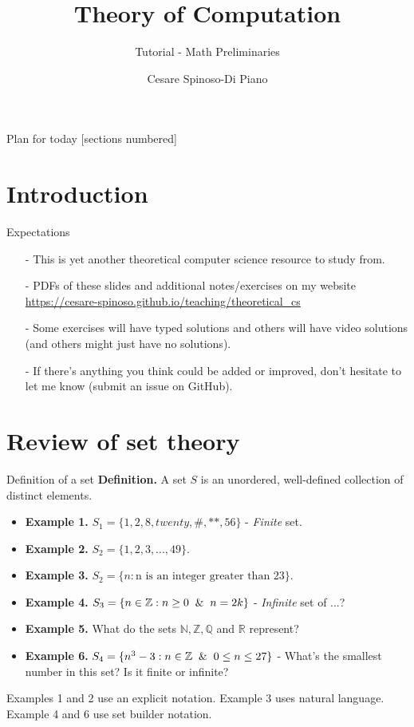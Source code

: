 \documentclass[10pt]{beamer}
\title{Theory of Computation}
\subtitle{Tutorial - Math Preliminaries}
\author{Cesare Spinoso-Di Piano}
\date{}
\begin{document}
\maketitle

\begin{frame}{Plan for today}
    [sections numbered]
    \tableofcontents[hideallsubsections]
\end{frame}

\section{Introduction}


\begin{frame}{Expectations}
    \begin{itemize}
        \item[-] This is yet another theoretical computer science resource to study from.
        \item[-] PDFs of these slides and additional notes/exercises on my website \href{https://cesare-spinoso.github.io/teaching/theoretical_cs}{https://cesare-spinoso.github.io/teaching/theoretical\_cs}
        \item[-] Some exercises will have typed solutions and others will have video solutions (and others might just have no solutions).
        \item[-] If there's anything you think could be added or improved, don't hesitate to let me know (submit an issue on GitHub).
    \end{itemize}
\end{frame}

\section{Review of set theory}

\begin{frame}{Definition of a set}
    \textbf{Definition.} A set $S$ is an unordered, well-defined collection of distinct elements.
    \begin{itemize}
        \item \textbf{Example 1.} $S_1 = \{1,2,8,twenty,\#,**,56 \}$ - \textit{Finite} set.
        \item \textbf{Example 2.} $S_2 = \{1,2,3,...,49\}$.
        \item \textbf{Example 3.} $S_2 = \{n: \text{n is an integer greater than 23}\}$.
        \item \textbf{Example 4.} $S_3 = \{n \in \mathbb{Z}:n \geq 0 \And n=2k \}$ - \textit{Infinite} set of ...?
        \item \textbf{Example 5.} What do the sets $\mathbb{N},\mathbb{Z}, \mathbb{Q}$ and $\mathbb{R}$ represent?
        \item \textbf{Example 6.} $S_4 = \{n^3 - 3: n \in \mathbb{Z} \And 0 \leq n \leq 27 \}$ - What's the smallest number in this set? Is it finite or infinite?
    \end{itemize}
    Examples 1 and 2 use an explicit notation. Example 3 uses natural language. Example 4 and 6 use set builder notation.
\end{frame}
\end{document}
